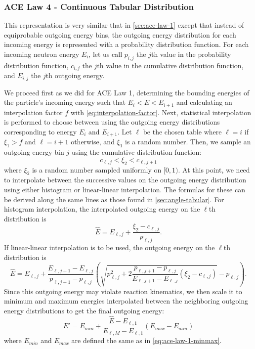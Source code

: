 \subsubsection{ACE Law 4 - Continuous Tabular Distribution}
\label{sec:ace-law-4}

This representation is very similar that in \autoref{sec:ace-law-1} except that
instead of equiprobable outgoing energy bins, the outgoing energy distribution
for each incoming energy is represented with a probability distribution
function. For each incoming neutron energy $E_i$, let us call $p_{i,j}$ the
$j$th value in the probability distribution function, $c_{i,j}$ the $j$th value
in the cumulative distribution function, and $E_{i,j}$ the $j$th outgoing
energy.

We proceed first as we did for ACE Law 1, determining the bounding energies of
the particle's incoming energy such that $E_i < E < E_{i+1}$ and calculating an
interpolation factor $f$ with \eqref{eq:interpolation-factor}. Next, statistical
interpolation is performed to choose between using the outgoing energy
distributions corresponding to energy $E_i$ and $E_{i+1}$. Let $\ell$ be the
chosen table where $\ell = i$ if $\xi_1 > f$ and $\ell = i + 1$ otherwise, and
$\xi_1$ is a random number. Then, we sample an outgoing energy bin $j$ using the
cumulative distribution function:
\begin{equation}
  \label{eq:ace-law-4-sample-cdf}
  c_{\ell,j} < \xi_2 < c_{\ell,j+1}
\end{equation}
where $\xi_2$ is a random number sampled uniformly on $[0,1)$. At this point, we
  need to interpolate between the successive values on the outgoing energy
  distribution using either histogram or linear-linear interpolation. The
  formulas for these can be derived along the same lines as those found in
  \autoref{sec:angle-tabular}. For histogram interpolation, the interpolated
  outgoing energy on the $\ell$th distribution is
\begin{equation}
  \label{eq:energy-histogram}
  \hat{E} = E_{\ell,j} + \frac{\xi_2 - c_{\ell,j}}{p_{\ell,j}}.
\end{equation}
If linear-linear interpolation is to be used, the outgoing energy on the
$\ell$th distribution is
\begin{equation}
  \label{eq:energy-linlin}
  \hat{E} = E_{\ell,j} + \frac{E_{\ell,j+1} - E_{\ell,j}}{p_{\ell,j+1} -
    p_{\ell,j}} \left ( \sqrt{p_{\ell,j}^2 + 2 \frac{p_{\ell,j+1} -
      p_{\ell,j}}{E_{\ell,j+1} - E_{\ell,j}} ( \xi_2 - c_{\ell,j} )} -
  p_{\ell,j} \right ).
\end{equation}
Since this outgoing energy may violate reaction kinematics, we then scale it to
minimum and maximum energies interpolated between the neighboring outgoing
energy distributions to get the final outgoing energy:
\begin{equation}
  \label{eq:ace-law-4-energy}
  E' = E_{min} + \frac{\hat{E} - E_{\ell,1}}{E_{\ell,M} - E_{\ell,1}}
  (E_{max} - E_{min})
\end{equation}
where $E_{min}$ and $E_{max}$ are defined the same as in
\eqref{eq:ace-law-1-minmax}.


